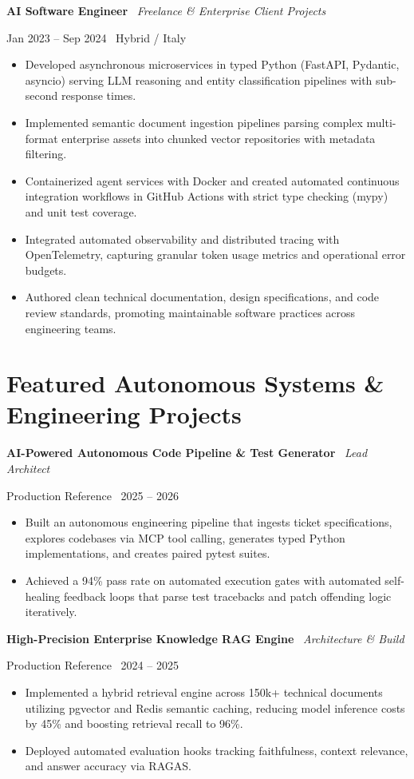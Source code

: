\documentclass[a4paper,10pt]{article}
\newcommand{\role}[4]{%
  \vspace{2pt}\noindent
  \begin{minipage}[t]{0.70\textwidth}\raggedright\textbf{#1} \textbullet\ \textit{#3}\end{minipage}%
  \hfill
  \begin{minipage}[t]{0.28\textwidth}\raggedleft\footnotesize\color{gray}#2 \textbullet\ #4\end{minipage}%
  \vspace{1pt}%
}
\begin{document}
\role{AI Software Engineer}{Jan 2023 -- Sep 2024}{Freelance \& Enterprise Client Projects}{Hybrid / Italy}
\begin{itemize}
  \item Developed asynchronous microservices in typed Python (FastAPI, Pydantic, asyncio) serving LLM reasoning and entity classification pipelines with sub-second response times.
  \item Implemented semantic document ingestion pipelines parsing complex multi-format enterprise assets into chunked vector repositories with metadata filtering.
  \item Containerized agent services with Docker and created automated continuous integration workflows in GitHub Actions with strict type checking (mypy) and unit test coverage.
  \item Integrated automated observability and distributed tracing with OpenTelemetry, capturing granular token usage metrics and operational error budgets.
  \item Authored clean technical documentation, design specifications, and code review standards, promoting maintainable software practices across engineering teams.
\end{itemize}

\section{Featured Autonomous Systems \& Engineering Projects}

\role{AI-Powered Autonomous Code Pipeline \& Test Generator}{Production Reference}{Lead Architect}{2025 -- 2026}
\begin{itemize}
  \item Built an autonomous engineering pipeline that ingests ticket specifications, explores codebases via MCP tool calling, generates typed Python implementations, and creates paired pytest suites.
  \item Achieved a 94\% pass rate on automated execution gates with automated self-healing feedback loops that parse test tracebacks and patch offending logic iteratively.
\end{itemize}

\role{High-Precision Enterprise Knowledge RAG Engine}{Production Reference}{Architecture \& Build}{2024 -- 2025}
\begin{itemize}
  \item Implemented a hybrid retrieval engine across 150k+ technical documents utilizing pgvector and Redis semantic caching, reducing model inference costs by 45\% and boosting retrieval recall to 96\%.
  \item Deployed automated evaluation hooks tracking faithfulness, context relevance, and answer accuracy via RAGAS.
\end{itemize}
\end{document}
